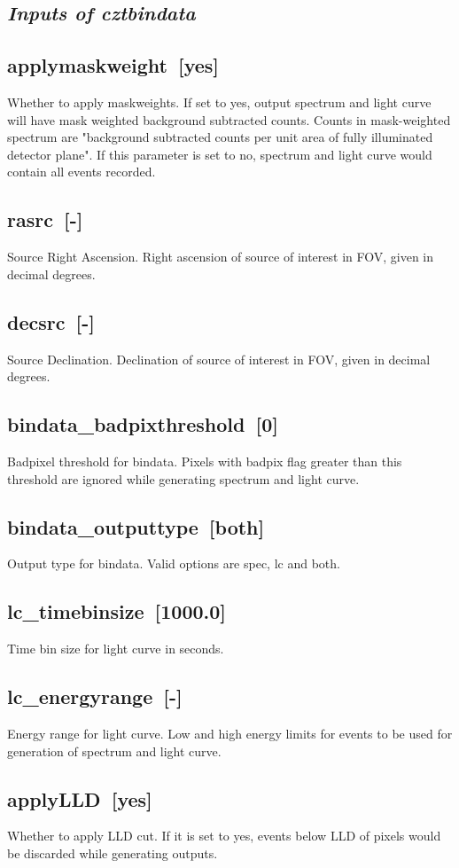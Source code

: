 \documentclass[11pt,oneside,a4paper]{article}
\begin{document}
\subsection*{\emph{Inputs of cztbindata}}

\subsection*{applymaskweight~[yes]}
    Whether to apply maskweights. If set to yes, output spectrum and light curve will 
have mask weighted background subtracted counts. Counts in mask-weighted spectrum are 
"background subtracted counts per unit area of fully illuminated detector plane". If 
this parameter is set to no, spectrum and light curve would contain all events recorded.
 \subsection*{rasrc~[-]}
    Source Right Ascension. Right ascension of source of interest in FOV, given in 
decimal degrees. 
\subsection*{decsrc~[-]}
    Source Declination. Declination of source of interest in FOV, given in 
decimal degrees.
\subsection*{bindata\_badpixthreshold~[0]}
    Badpixel threshold for bindata. Pixels with badpix flag greater than this threshold 
are ignored while generating spectrum and light curve.
\subsection*{bindata\_outputtype~[both]}
    Output type for bindata. Valid options are spec, lc and both.
\subsection*{lc\_timebinsize~[1000.0]}
    Time bin size for light curve in seconds.
\subsection*{lc\_energyrange~[-]}
    Energy range for light curve. Low and high energy limits for events to be used 
for generation of spectrum and light curve.
\subsection*{applyLLD~[yes]}
    Whether to apply LLD cut. If it is set to yes, events below LLD of pixels would be discarded 
while generating outputs.
\end{document}
